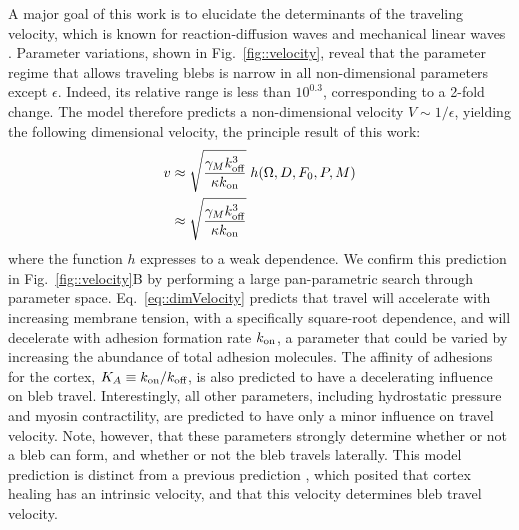A major goal of this work is to elucidate the determinants of the traveling velocity, which is known for reaction-diffusion waves and mechanical linear waves \cite{Allard:2012if}. Parameter variations, shown in Fig.~\ref{fig::velocity}, reveal that the parameter regime that allows traveling blebs is narrow in all non-dimensional parameters except $\epsilon$. Indeed, its relative range is less than $10^{0.3}$, corresponding to a 2-fold change. The model therefore predicts a non-dimensional velocity $V\sim 1/\epsilon$, yielding the following dimensional velocity, the principle result of this work:  
\begin{align}
v &\approx \sqrt{\frac{\gamma_M k_{\mbox{\scriptsize off}}^3}{\kappa k_{\mbox{\scriptsize on}}}}\; h(\Omega,D,F_0,P,M)\\
 &\approx \sqrt{\frac{\gamma_M k_{\mbox{\scriptsize off}}^3}{\kappa k_{\mbox{\scriptsize on}}}} \label{eq::dimVelocity}
\end{align}
where the function $h$ expresses to a weak dependence. We confirm this prediction in Fig.~\ref{fig::velocity}B by performing a large pan-parametric search through parameter space. 
Eq.~\ref{eq::dimVelocity} predicts that travel will accelerate with increasing membrane tension, with a specifically square-root dependence, and will decelerate with adhesion formation rate $k_{\mbox{\scriptsize on}}$, a parameter that could be varied by increasing the abundance of total adhesion molecules. The affinity of adhesions for the cortex, $K_A\equiv k_{\mbox{\scriptsize on}}/k_{\mbox{\scriptsize off}}$, is also predicted to have a decelerating influence on bleb travel. Interestingly, all other parameters, including hydrostatic pressure and myosin contractility, are predicted to have only a minor influence on travel velocity. Note, however, that these parameters strongly determine whether or not a bleb can form, and whether or not the bleb travels laterally. This model prediction is distinct from a previous prediction \cite{Lim:2012fz}, which posited that cortex healing has an intrinsic velocity, and that this velocity determines bleb travel velocity.  



